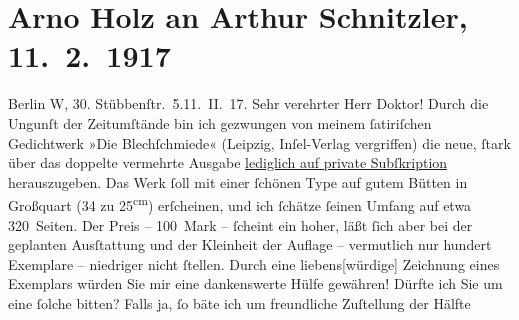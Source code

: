 

         
         \renewcommand{\erwaehntePersonen}{Personen: Arno Holz}
         \renewcommand{\erwaehnteInstitutionen}{Institutionen: Insel-Verlag, Petzschke {\kaufmannsund}  Gretschel}
         \renewcommand{\erwaehnteOrte}{Orte: Berlin, Dresden, Leipzig, Stübbenstraße, Wien}
         \renewcommand{\erwaehnteWerke}{Werke: Die Blechschmiede}
               \section[Arno Holz an Arthur Schnitzler, 11. 2. 1917]{ Arno Holz an Arthur Schnitzler, 11. 2. 1917}\nopagebreak{}\rehead{ }\begin{ledgroupsized}[t]{13cm}\normalsize\beginnumbering \toendnotes[C]{\smallbreak\pagebreak[2]} 
\pstart
           \raggedleft{}{\pb}Berlin W, 30. Stübbenſtr. 5.\hspace*{1.5em}11. II. 17. \pend
           \pstart\center{}Sehr verehrter Herr Doktor!\pend\pstart
           Durch die Ungunſt der Zeitumſtände bin ich gezwungen von meinem ſatiriſchen
               Gedichtwerk »Die Blechſchmiede« (Leipzig, Inſel-Verlag vergriffen) die neue, ſtark über das doppelte vermehrte Ausgabe
                  \uline{lediglich auf private Subſkription} herauszugeben.
               Das Werk ſoll mit einer ſchönen Type auf gutem Bütten in Großquart (34 zu 25\textsuperscript{cm}) erſcheinen, und ich ſchätze ſeinen Umfang auf etwa
               320 Seiten. Der Preis – 100 Mark – ſcheint ein hoher, läßt ſich aber bei der
               geplanten Ausſtattung und der Kleinheit der Auflage – vermutlich nur hundert
               Exemplare – niedriger nicht ſtellen. Durch eine liebens{[}würdige{]}
               Zeichnung eines Exemplars würden Sie mir eine dankenswerte Hülfe gewähren! Dürfte ich
               Sie um eine ſolche bitten? Falls ja, ſo bäte ich um freundliche Zuſtellung der Hälfte

\end{ledgroupsized}
